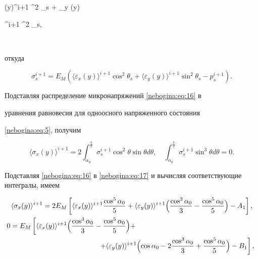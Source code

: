 (y)\rangle^{i+1} \cos^2 \theta_s + \langle\varepsilon_y (y)\rangle

^{i+1} \sin^2 \theta_s,

$$

откуда

\begin{equation} \label{nebogina:eq:16}

\sigma_s^{i+1} = E_M \left( \langle\varepsilon_x (y)\rangle^{i+1}

\cos^2 \theta_s + \langle\varepsilon_y (y)\rangle ^{i+1} \sin^2

\theta_s - p_s^{i+1} \right).

\end{equation}

Подставляя распределение микронапряжений \eqref{nebogina:eq:16} в

уравнения равновесия для одноосного напряженного состояния

\eqref{nebogina:eq:5}, получим

\begin{equation}\label{nebogina:eq:17}

\langle \sigma_x (y)\rangle^{i+1} = 2 \int _{\alpha_0}^{\frac {\pi}2} \sigma_s^{i+1} \cos^2 \theta \sin

\theta d \theta,\quad 

\int _{\alpha_0}^{\frac {\pi}2} \sigma_s^{i+1} \sin^3 \theta

d \theta = 0.

\end{equation}

Подставляя \eqref{nebogina:eq:16} в \eqref{nebogina:eq:17} и вычисляя соответствующие интегралы, имеем

\begin{gather} 

\langle \sigma_x (y)\rangle^{i+1} = 2 E_M \left[\langle\varepsilon_x (y)\rangle^{i+1}

 \frac{\cos^5 \alpha_0}5 + \langle\varepsilon_y (y)\rangle^{i+1}\Bigl ( \frac{\cos^3 \alpha_0}3 -

 \frac{\cos^5 \alpha_0}5 \Bigr) - A_1 \right], \\

0 = E_M \left[\langle\varepsilon_x (y)\rangle^{i+1} \Bigl( \frac{\cos^3 \alpha_0}3 - \frac{\cos^5 \alpha_0}5 \Bigr) + \right. \hspace{6cm}

\label{nebogina:eq:18}

\\ 

\hspace{4.5cm}

\left.

+

\langle\varepsilon_y (y)\rangle^{i+1} \Bigl( \cos \alpha_0 - 2

\frac{\cos^3 \alpha_0}3 + \frac{\cos^5 \alpha_0}5 \Bigr) - B_1

\right],

\end{gather}

